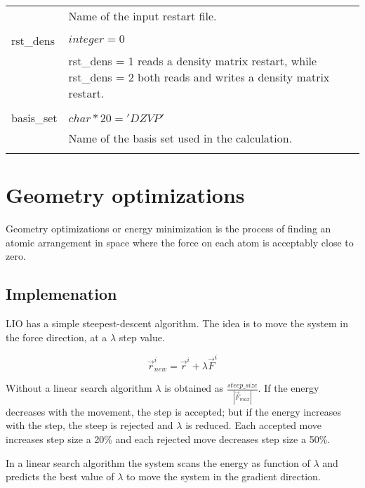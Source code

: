 \begin{Spacing}{1.0}
\begin{longtable}{ p{} p{} }
        & Name of the input restart file. \\
        \\
        rst\_dens & $ integer = 0 $ \\
        & rst\_dens = 1 reads a density matrix restart, while rst\_dens = 2
        both reads and writes a density matrix restart. \\
        \\
        basis\_set & $ char*20 = 'DZVP' $ \\
        & Name of the basis set used in the calculation.\\
        \\

  \end{longtable}
\end{Spacing}
    

\section{Geometry optimizations}

Geometry optimizations or energy minimization is the process of finding an atomic arrangement in space where the force on each atom is acceptably close to zero.

    \subsection{Implemenation}
    
    LIO has a simple steepest-descent algorithm. The idea is to move the system in the force direction, at a $\lambda$ step value.
    
    \begin{equation}
      \vec{r}^i_{new}=\vec{r}^i + \lambda  \vec{F}^i  
      \label{new_force}
    \end{equation}
    
    Without a linear search algorithm $\lambda$ is obtained as $\frac{steep\_ size}{|\vec{F}_{max}|}$. If the energy decreases with the movement, the step is accepted; but if the energy increases with the step, the steep is rejected and $\lambda$ is reduced. Each accepted move increases step size a 20\% and each rejected move decreases step size a 50\%.
    
    In a linear search algorithm the system scans the energy as function of $\lambda$ and predicts the best value of $\lambda$ to move the system in the gradient direction.
    
